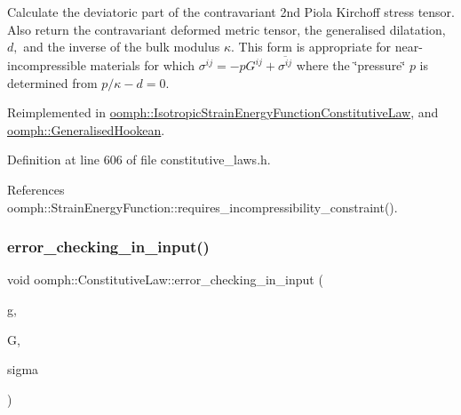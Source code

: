 Calculate the deviatoric part of the contravariant 2nd Piola Kirchoff stress tensor. Also return the contravariant deformed metric tensor, the generalised dilatation, $ d, $ and the inverse of the bulk modulus $ \kappa$. This form is appropriate for near-\/incompressible materials for which $ \sigma^{ij} = -p G^{ij} + \overline{ \sigma^{ij}} $ where the \char`\"{}pressure\char`\"{} $ p $ is determined from $ p / \kappa - d =0 $. 



Reimplemented in \hyperlink{classoomph_1_1IsotropicStrainEnergyFunctionConstitutiveLaw_aa45d82d322fda480f88e78cddd557837}{oomph\+::\+Isotropic\+Strain\+Energy\+Function\+Constitutive\+Law}, and \hyperlink{classoomph_1_1GeneralisedHookean_ad19b5e80755f5d8e5513c4199f62fe03}{oomph\+::\+Generalised\+Hookean}.



Definition at line 606 of file constitutive\+\_\+laws.\+h.



References oomph\+::\+Strain\+Energy\+Function\+::requires\+\_\+incompressibility\+\_\+constraint().

\mbox{\label{classoomph_1_1ConstitutiveLaw_a01763658a56a962460a80607653a33b4}} 
\subsubsection{\texorpdfstring{error\+\_\+checking\+\_\+in\+\_\+input()}{error\_checking\_in\_input()}}
{\footnotesize\ttfamily void oomph\+::\+Constitutive\+Law\+::error\+\_\+checking\+\_\+in\+\_\+input (\begin{DoxyParamCaption}\item[{const \hyperlink{classoomph_1_1DenseMatrix}{Dense\+Matrix}$<$ double $>$ \&}]{g,  }\item[{const \hyperlink{classoomph_1_1DenseMatrix}{Dense\+Matrix}$<$ double $>$ \&}]{G,  }\item[{\hyperlink{classoomph_1_1DenseMatrix}{Dense\+Matrix}$<$ double $>$ \&}]{sigma }\end{DoxyParamCaption})\hspace{0.3cm}{\ttfamily [protected]}}



